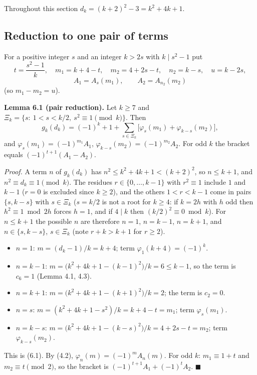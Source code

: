 Throughout this section \(d_k=(k+2)^2-3=k^2+4k+1\).

\subsection{Reduction to one pair of terms}\label{reduction-to-one-pair-of-terms}

For a positive integer \(s\) and an integer \(k>2s\) with \(k\mid s^2-1\) put
\[t=\frac{s^2-1}{k},\quad m_1=k+4-t,\quad m_2=4+2s-t,\quad n_2=k-s,\quad u=k-2s,\]
\[A_1=A_s(m_1),\qquad A_2=A_{n_2}(m_2)\]
(so \(m_1-m_2=u\)).

\textbf{Lemma 6.1 (pair reduction).} Let \(k\ge7\) and \(\Xi_k=\{s:\ 1<s<k/2,\ s^2\equiv1\pmod k\}\). Then
\[g_k(d_k)=(-1)^k+1+\sum_{s\in\Xi_k}\bigl[\varphi_s(m_1)+\varphi_{k-s}(m_2)\bigr],\tag{6.1}\]
and \(\varphi_s(m_1)=(-1)^{m_1}A_1\), \(\varphi_{k-s}(m_2)=(-1)^{m_2}A_2\). For odd \(k\) the bracket equals \((-1)^{t+1}(A_1-A_2)\).

\emph{Proof.} A term \(n\) of \(g_k(d_k)\) has \(n^2\le k^2+4k+1<(k+2)^2\), so \(n\le k+1\), and \(n^2\equiv d_k\equiv1\pmod k\). The residues \(r\in\{0,\dots,k-1\}\) with \(r^2\equiv1\) include \(1\) and \(k-1\) (\(r=0\) is excluded since \(k\ge2\)), and the others \(1<r<k-1\) come in pairs \(\{s,k-s\}\) with \(s\in\Xi_k\) (\(s=k/2\) is not a root for \(k\ge4\): if \(k=2h\) with \(h\) odd then \(h^2\equiv1\bmod 2h\) forces \(h=1\), and if \(4\mid k\) then \((k/2)^2\equiv0\bmod k\)). For \(n\le k+1\) the possible \(n\) are therefore \(n=1\), \(n=k-1\), \(n=k+1\), and \(n\in\{s,k-s\}\), \(s\in\Xi_k\) (note \(r+k>k+1\) for \(r\ge2\)).

\begin{itemize}
\tightlist
\item
  \(n=1\): \(m=(d_k-1)/k=k+4\); term \(\varphi_1(k+4)=(-1)^{k}\).
\item
  \(n=k-1\): \(m=\bigl(k^2+4k+1-(k-1)^2\bigr)/k=6\le k-1\), so the term is \(c_6=1\) (Lemma 4.1, 4.3).
\item
  \(n=k+1\): \(m=\bigl(k^2+4k+1-(k+1)^2\bigr)/k=2\); the term is \(c_2=0\).
\item
  \(n=s\): \(m=(k^2+4k+1-s^2)/k=k+4-t=m_1\); term \(\varphi_s(m_1)\).
\item
  \(n=k-s\): \(m=\bigl(k^2+4k+1-(k-s)^2\bigr)/k=4+2s-t=m_2\); term \(\varphi_{k-s}(m_2)\).
\end{itemize}

This is (6.1). By (4.2), \(\varphi_n(m)=(-1)^mA_n(m)\). For odd \(k\): \(m_1\equiv1+t\) and \(m_2\equiv t\pmod 2\), so the bracket is \((-1)^{t+1}A_1+(-1)^tA_2\). \(\blacksquare\)


